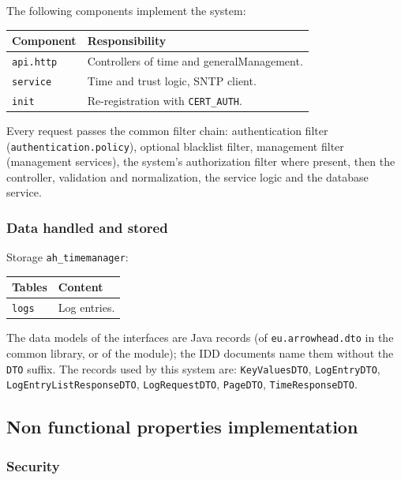 \documentclass[a4paper]{arrowhead}
\begin{document}
The following components implement the system:

\noindent\begin{longtable}{| p{5.6cm} | p{9.6cm} |} \hline
\rowcolor{gray!33} Component & Responsibility \\ \hline \endhead
\texttt{api.\allowbreak{}http} & Controllers of time and generalManagement. \\ \hline
\texttt{service} & Time and trust logic, SNTP client. \\ \hline
\texttt{init} & Re-registration with \texttt{CERT\_\allowbreak{}AUTH}. \\ \hline
\end{longtable}

Every request passes the common filter chain: authentication filter (\texttt{authentication.\allowbreak{}policy}), optional blacklist filter, management filter (management services), the system's authorization filter where present, then the controller, validation and normalization, the service logic and the database service.

\subsubsection{Data handled and stored}

Storage \texttt{ah\_\allowbreak{}timemanager}:

\noindent\begin{longtable}{| p{6.4cm} | p{8.8cm} |} \hline
\rowcolor{gray!33} Tables & Content \\ \hline \endhead
\texttt{logs} & Log entries. \\ \hline
\end{longtable}

The data models of the interfaces are Java records (of \texttt{eu.arrowhead.dto} in the common library, or of the module); the IDD documents name them without the \texttt{DTO} suffix. The records used by this system are: \texttt{KeyValuesDTO}, \texttt{LogEntryDTO}, \texttt{Log\allowbreak{}Entry\allowbreak{}List\allowbreak{}Response\allowbreak{}DTO}, \texttt{LogRequestDTO}, \texttt{PageDTO}, \texttt{TimeResponseDTO}.

\subsection{Non functional properties implementation}

\subsubsection{Security}
\end{document}
